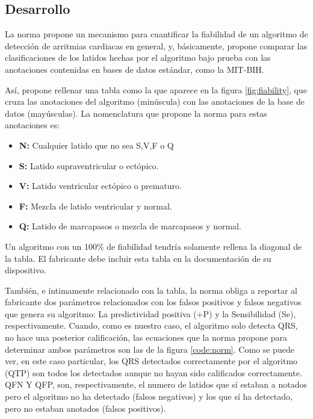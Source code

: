     \subsection{Desarrollo}
    
    
    La norma propone un mecanismo para cuantificar la fiabilidad de un algoritmo de detección de arritmias cardiacas en general, y, básicamente, propone comparar las clasificaciones de los latidos hechas por el algoritmo bajo prueba con las anotaciones contenidas en bases de datos estándar, como la MIT-BIH. 
    
    Así, propone rellenar una tabla como la que aparece en la figura \ref{fig:fiability}, que cruza las anotaciones del algoritmo (minúscula) con las anotaciones de la base de datos (mayúsculas). La nomenclatura que propone la norma para estas anotaciones es: 
    \begin{itemize}
        \item \textbf{N:} Cualquier latido que no sea S,V,F o Q
        \item \textbf{S:} Latido supraventricular o ectópico.
        \item \textbf{V:} Latido ventricular ectópico o prematuro.
        \item \textbf{F:} Mezcla de latido ventricular y normal.
        \item \textbf{Q:} Latido de marcapasos o mezcla de marcapasos y normal.
    \end{itemize}
     
    Un algoritmo con un 100\% de fiabilidad tendría solamente rellena la diagonal de la tabla. El fabricante debe incluir esta tabla en la documentación de su dispositivo.
    
    También, e íntimamente relacionado con la tabla, la norma obliga  a reportar al fabricante dos parámetros relacionados con los falsos positivos y falsos negativos que genera su algoritmo: La predictividad positiva (+P) y la Sensibilidad (Se), respectivamente. Cuando, como es nuestro caso, el algoritmo solo detecta QRS, no hace una posterior calificación, las ecuaciones que la norma propone para determinar ambos parámetros son las de la figura \ref{code:norm}. Como se puede ver, en este caso particular, los QRS detectados correctamente por el algoritmo (QTP) son todos los detectados aunque no hayan sido calificados correctamente. QFN Y QFP, son, respectivamente, el numero de latidos que sí estaban a notados pero el algoritmo no ha detectado (falsos negativos) y los que sí ha detectado, pero no estaban anotados (falsos positivos).
     
